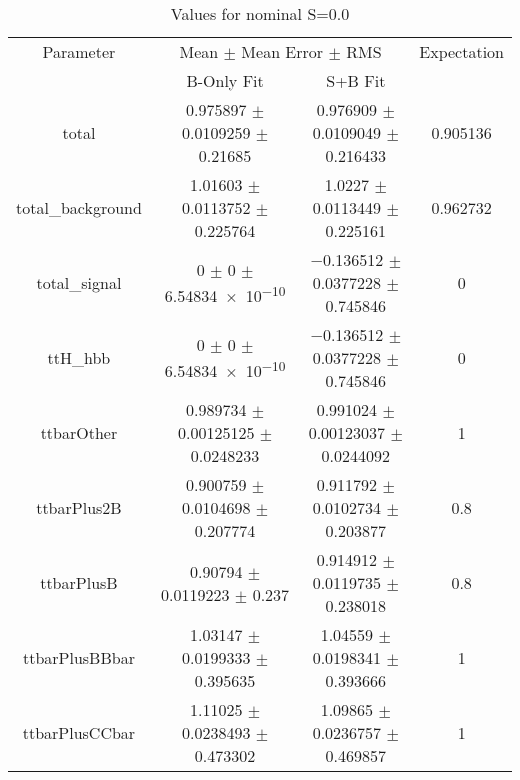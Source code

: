 \begin{table}
\centering
\caption{Values for nominal S=0.0}
\begin{tabular}{cccc}
\toprule
Parameter & \multicolumn{2}{c}{Mean $\pm$ Mean Error $\pm$ RMS} & Expectation\\
 & B-Only Fit & S+B Fit & \\
\midrule
total & \num{0.975897} $\pm$ \num{0.0109259} $\pm$ \num{0.21685} & \num{0.976909} $\pm$ \num{0.0109049} $\pm$ \num{0.216433} & \num{0.905136}\\
total\_background & \num{1.01603} $\pm$ \num{0.0113752} $\pm$ \num{0.225764} & \num{1.0227} $\pm$ \num{0.0113449} $\pm$ \num{0.225161} & \num{0.962732}\\
total\_signal & \num{0} $\pm$ \num{0} $\pm$ \num{6.54834e-10} & \num{-0.136512} $\pm$ \num{0.0377228} $\pm$ \num{0.745846} & \num{0}\\
ttH\_hbb & \num{0} $\pm$ \num{0} $\pm$ \num{6.54834e-10} & \num{-0.136512} $\pm$ \num{0.0377228} $\pm$ \num{0.745846} & \num{0}\\
ttbarOther & \num{0.989734} $\pm$ \num{0.00125125} $\pm$ \num{0.0248233} & \num{0.991024} $\pm$ \num{0.00123037} $\pm$ \num{0.0244092} & \num{1}\\
ttbarPlus2B & \num{0.900759} $\pm$ \num{0.0104698} $\pm$ \num{0.207774} & \num{0.911792} $\pm$ \num{0.0102734} $\pm$ \num{0.203877} & \num{0.8}\\
ttbarPlusB & \num{0.90794} $\pm$ \num{0.0119223} $\pm$ \num{0.237} & \num{0.914912} $\pm$ \num{0.0119735} $\pm$ \num{0.238018} & \num{0.8}\\
ttbarPlusBBbar & \num{1.03147} $\pm$ \num{0.0199333} $\pm$ \num{0.395635} & \num{1.04559} $\pm$ \num{0.0198341} $\pm$ \num{0.393666} & \num{1}\\
ttbarPlusCCbar & \num{1.11025} $\pm$ \num{0.0238493} $\pm$ \num{0.473302} & \num{1.09865} $\pm$ \num{0.0236757} $\pm$ \num{0.469857} & \num{1}\\
\bottomrule
\end{tabular}
\end{table}